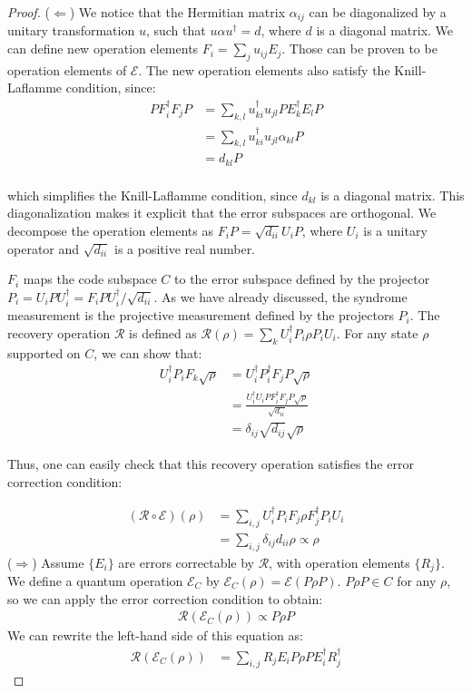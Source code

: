 \documentclass[12pt, twoside, openany]{book}
\begin{document}
\begin{proof}
    ($\Leftarrow$) We notice that the Hermitian matrix $\alpha_{ij}$ can be diagonalized by a unitary transformation $u$, such that $u \alpha u^\dagger = d$, where $d$ is a diagonal matrix. We can define new operation elements $F_i = \sum_j u_{ij} E_j$. Those can be proven to be operation elements of $\mathcal{E}$. The new operation elements also satisfy the Knill-Laflamme condition, since:
\begin{align*}
    P F_i^\dagger F_j P &= \sum_{k,l} u_{ki}^\dagger u_{jl} P E_k^\dagger E_l P \\
    &= \sum_{k,l} u_{ki}^\dagger u_{jl} \alpha_{kl} P \\
    &= d_{kl} P \\
\end{align*}

which simplifies the Knill-Laflamme condition, since $d_{kl}$ is a diagonal matrix. This diagonalization makes it explicit that the error subspaces are orthogonal. We decompose the operation elements as $F_i P = \sqrt{d_{ii}} U_i P$, where $U_i$ is a unitary operator and $\sqrt{d_{ii}}$ is a positive real number.

$F_i$ maps the code subspace $C$ to the error subspace defined by the projector $P_i = U_i P U_i^\dagger = F_i P U_i^\dagger / \sqrt{d_{ii}}$. As we have already discussed, the syndrome measurement is the projective measurement defined by the projectors $P_i$. The recovery operation $\mathcal{R}$ is defined as $\mathcal{R}(\rho) = \sum_k U_i^\dagger P_i \rho P_i U_i$. For any state $\rho$ supported on $C$, we can show that:
\begin{align*}
    U_i^\dagger P_i F_k \sqrt{\rho} &=  U_i^\dagger P_i^\dagger F_j P \sqrt{\rho} \\
    &= \frac{U_i^\dagger U_i P F_i^\dagger F_j P \sqrt{\rho}}{\sqrt{d_{ii}}} \\
    &= \delta_{ij} \sqrt{d_{ij}} \sqrt{\rho}
\end{align*}

Thus, one can easily check that this recovery operation satisfies the error correction condition:

\begin{align*}
    (\mathcal{R} \circ \mathcal{E})(\rho) &= \sum_{i,j} U_i^\dagger P_i F_j \rho F_j^\dagger P_i U_i \\
    &= \sum_{i,j} \delta_{ij} d_{ii} \rho \propto \rho
\end{align*}
($\Rightarrow$) Assume $\{ E_i \}$ are errors correctable by $\mathcal{R}$, with operation elements $\{ R_j \}$. We define a quantum operation $\mathcal{E}_C$ by $\mathcal{E}_C(\rho) =  \mathcal{E}(P \rho P) $. $P \rho P \in C$ for any $\rho$, so we can apply the error correction condition to obtain:
\begin{align*}
    \mathcal{R} ( \mathcal{E}_C(\rho) ) \propto P \rho P
\end{align*}
We can rewrite the left-hand side of this equation as:
\begin{align*}
    \mathcal{R} ( \mathcal{E}_C(\rho) ) &= \sum_{i,j} R_j E_i P \rho P E_i^\dagger R_j^\dagger
\end{align*}


\end{proof}
\end{document}
